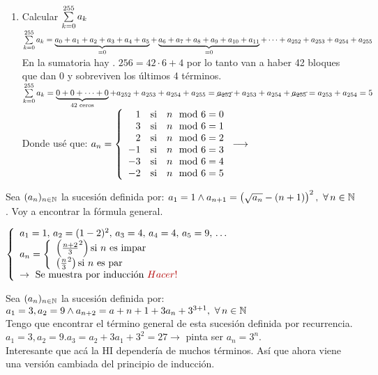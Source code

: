 \documentclass[12pt,a4paper, spanish]{article}
\begin{document}
\begin{enumerate}[label=(\alph*)]
	\item Calcular $\sumatoria{k=0}{255} a_k$ \\
	      $\sumatoria{k=0}{255} a_k =
		      \underbrace{\textstyle a_0 + a_1 + a_2 + a_3 + a_4 + a_5}_{= 0} +
		      \underbrace{\textstyle a_6 + a_7 + a_8 + a_9 + a_{10} + a_{11} }_{=0} +
		      \cdots +
		      a_{252} + a_{253} + a_{254} + a_{255}
	      $\\
	      En la sumatoria hay . $256 = 42 \cdot 6 + 4$ por lo tanto van a haber 42 bloques que dan 0 y sobreviven los últimos 4 términos.
	      $\sumatoria{k=0}{255} a_k = \underbrace{\textstyle 0 + 0 + \dots + 0}_{42 \text{ ceros}} + a_{252} + a_{253} + a_{254} + a_{255} =
		      \cancel{a_{252}} + a_{253} + a_{254} + \cancel{a_{255}} = a_{253} + a_{254} = 5\\
	      $ Donde usé que: $a_n =
		      \llave{rcl}{
			      1 & \text{si} & n\mod6 = 0 \\
			      3 & \text{si} & n\mod6 = 1 \\
			      2 & \text{si} & n\mod6 = 2 \\
			      -1 & \text{si} & n\mod6 = 3 \\
			      -3 & \text{si} & n\mod6 = 4 \\
			      -2 & \text{si} & n\mod6 = 5 \\
		      }\longrightarrow
	      $
	       \checkmark
\end{enumerate}

\separador

Sea $(a_n)_{n\en \naturales}$ la sucesión definida por:
$a_1 = 1 \y a_{n+1} = \parentesis{\sqrt{a_n} - (n+1)}^2, \, \paratodo n \en \naturales$.
Voy a encontrar la fórmula general.

$
	\llave{ l }{
		a_1 = 1,\, a_2 = (1 - 2)^2,\, a_3 = 4,\, a_4 = 4,\, a_5 = 9,\, \dots\\
		a_n =
		\llave{l}{
			\parentesis{\frac{n+2}{3}^2} \text{si $n$ es impar}\\
			\parentesis{\frac{n}{3}^2} \text{si $n$ es par}\\
		}\\
		\to \text{ Se muestra por inducción } \hacer\\
	}$


\separador

Sea $(a_n)_{n\en \naturales}$ la sucesión definida por: $a_1 = 3, a_2 = 9 \y a_{n+2} = a+{n+1}+ 3a_n +3^{3+1},\, \paratodo n \en \naturales$\\
Tengo que encontrar el término general de esta  sucesión definida por recurrencia.
$a_1 =3, a_2 = 9. a_3 = a_2 + 3a_1 + 3^2=27 \to$ pinta ser $a_n = 3^n$. \\
Interesante que acá la HI dependería de muchos términos. Así que ahora viene una versión
cambiada del principio de inducción.\\
\end{document}
